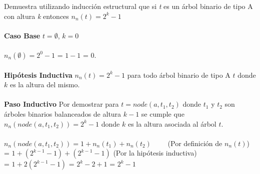     \bigskip
    
    \begin{exercise}
        Demuestra utilizando inducción estructural que si \textit{t} es un árbol binario de tipo A con altura \textit{k} entonces $n_n(t) = 2^k - 1$ \\\\
        \textbf{Caso Base} $t = \emptyset$, $k=0$\\\\
            $n_n(\emptyset) = 2^0 -1 $ = $1 -1$ = 0.\\\\
        \textbf{Hipótesis Inductiva} $n_n(t) = 2^k - 1$ para todo árbol binario de tipo A $t$ donde $k$ es la altura del mismo. \\\\
        \textbf{Paso Inductivo} Por demostrar para $t = node(a,t_1,t_2)$ donde $t_1$ y $t_2$ son árboles binarios balanceados de altura $k-1$ se cumple que $n_n(node(a,t_1,t_2)) = 2^k - 1$ donde $k$ es la altura asociada al árbol $t$. \\\\
            $n_n(node(a,t_1,t_2)) = 1 + n_n(t_1) + n_n(t_2)$ \quad \quad \quad \quad \quad \quad \ \ \ \   (Por definición de $n_n(t)$) \\
            = $1 + (2^{k-1} - 1) + (2^{k-1} - 1)$ \qquad \qquad \qquad \qquad \qquad \qquad  (Por la hipótesis inductiva) \\
            = $1 + 2(2^{k-1} - 1)$ = $2^k - 2 + 1$ = $2^k - 1$
    \end{exercise}


